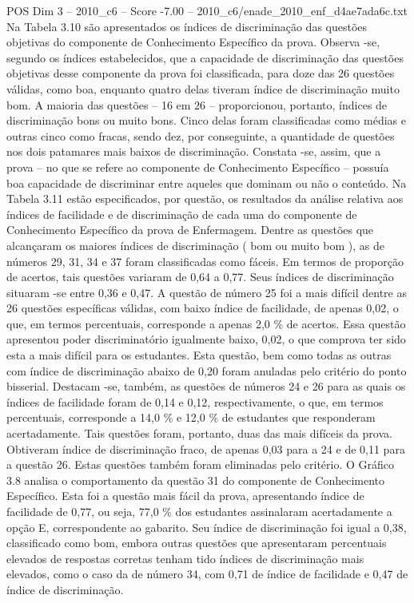 \begin{textsample}{POS Dim 3 – 2010\_c6 – Score -7.00 – 2010\_c6/enade\_2010\_enf\_d4ae7ada6c.txt}
Na Tabela 3.10 são apresentados os índices de discriminação das questões objetivas do componente de Conhecimento Específico da prova.
Observa -se, segundo os índices estabelecidos, que a capacidade de discriminação das questões objetivas desse componente da prova foi classificada, para doze das 26 questões válidas, como boa, enquanto quatro delas tiveram índice de discriminação muito bom.
A maioria das questões – 16 em 26 – proporcionou, portanto, índices de discriminação bons ou muito bons.
Cinco delas foram classificadas como médias e outras cinco como fracas, sendo dez, por conseguinte, a quantidade de questões nos dois patamares mais baixos de discriminação.
Constata -se, assim, que a prova – no que se refere ao componente de Conhecimento Específico – possuía boa capacidade de discriminar entre aqueles que dominam ou não o conteúdo.
Na Tabela 3.11 estão especificados, por questão, os resultados da análise relativa aos índices de facilidade e de discriminação de cada uma do componente de Conhecimento Específico da prova de Enfermagem.
Dentre as questões que alcançaram os maiores índices de discriminação ( bom ou muito bom ), as de números 29, 31, 34 e 37 foram classificadas como fáceis.
Em termos de proporção de acertos, tais questões variaram de 0,64 a 0,77.
Seus índices de discriminação situaram -se entre 0,36 e 0,47.
A questão de número 25 foi a mais difícil dentre as 26 questões específicas válidas, com baixo índice de facilidade, de apenas 0,02, o que, em termos percentuais, corresponde a apenas 2,0 \% de acertos.
Essa questão apresentou poder discriminatório igualmente baixo, 0,02, o que comprova ter sido esta a mais difícil para os estudantes.
Esta questão, bem como todas as outras com índice de discriminação abaixo de 0,20 foram anuladas pelo critério do ponto bisserial.
Destacam -se, também, as questões de números 24 e 26 para as quais os índices de facilidade foram de 0,14 e 0,12, respectivamente, o que, em termos percentuais, corresponde a 14,0 \% e 12,0 \% de estudantes que responderam acertadamente.
Tais questões foram, portanto, duas das mais difíceis da prova.
Obtiveram índice de discriminação fraco, de apenas 0,03 para a 24 e de 0,11 para a questão 26.
Estas questões também foram eliminadas pelo critério.
O Gráfico 3.8 analisa o comportamento da questão 31 do componente de Conhecimento Específico.
Esta foi a questão mais fácil da prova, apresentando índice de facilidade de 0,77, ou seja, 77,0 \% dos estudantes assinalaram acertadamente a opção E, correspondente ao gabarito.
Seu índice de discriminação foi igual a 0,38, classificado como bom, embora outras questões que apresentaram percentuais elevados de respostas corretas tenham tido índices de discriminação mais elevados, como o caso da de número 34, com 0,71 de índice de facilidade e 0,47 de índice de discriminação.

\end{textsample}
